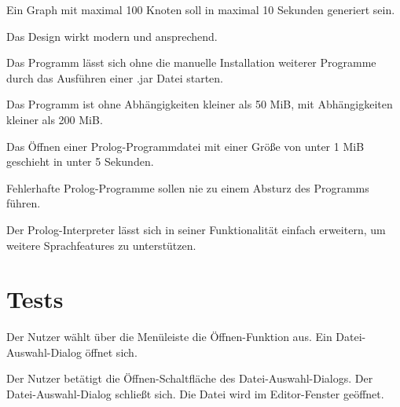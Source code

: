 \documentclass[parskip=full,11pt,twoside]{scrartcl}
\begin{document}

Ein Graph mit maximal 100 Knoten soll in maximal 10 Sekunden generiert sein.


Das Design wirkt modern und ansprechend.


Das Programm lässt sich ohne die manuelle Installation weiterer Programme durch das Ausführen einer .jar Datei starten.


Das Programm ist ohne Abhängigkeiten kleiner als 50 MiB, mit Abhängigkeiten kleiner als 200 MiB.


Das Öffnen einer Prolog-Programmdatei mit einer Größe von unter 1 MiB geschieht in unter 5 Sekunden.


Fehlerhafte Prolog-Programme sollen nie zu einem Absturz des Programms führen.


Der Prolog-Interpreter lässt sich in seiner Funktionalität einfach erweitern, um weitere Sprachfeatures zu unterstützen.

\section{Tests}


{Der Nutzer wählt über die Menüleiste die Öffnen-Funktion aus.}
{Ein Datei-Auswahl-Dialog öffnet sich.}

{Der Nutzer betätigt die Öffnen-Schaltfläche des Datei-Auswahl-Dialogs.}
{Der Datei-Auswahl-Dialog schließt sich. Die Datei wird im Editor-Fenster geöffnet.}

\end{document}
